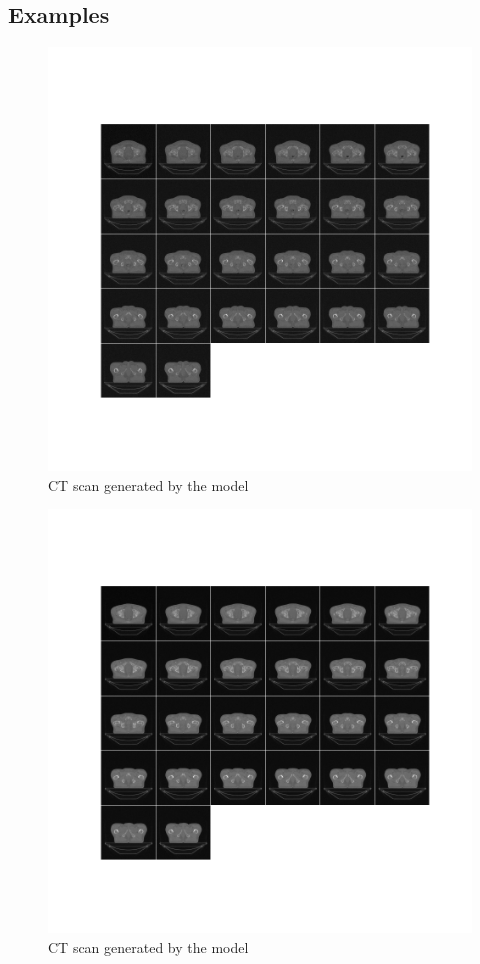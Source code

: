 \documentclass[11pt,a4paper]{report}
\begin{document}
\subsection{Examples}
\begin{figure}[H]
	\centering
	\includegraphics[scale=0.55]{images/generatedData1}
    \caption{CT scan generated by the model}
\end{figure}
\begin{figure}[H]
	\centering
	\includegraphics[scale=0.55]{images/generatedData2}
    \caption{CT scan generated by the model}
\end{figure}
\end{document}
